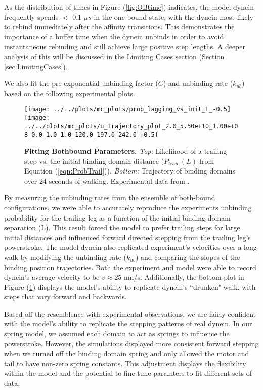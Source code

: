 As the distribution of times in Figure (\ref{fig:OBtime}) indicates, the model dynein frequently spends $<$ 0.1 $\mu s$ in the one-bound state, with the dynein most likely to rebind immediately after the affinity transitions. This demonstrates the importance of a buffer time when the dynein unbinds in order to avoid instantaneous rebinding and still achieve large positive step lengths. A deeper analysis of this will be discussed in the Limiting Cases section (Section \ref{sec:LimitingCases}).

We also fit the pre-exponential unbinding factor ($C$) and unbinding rate ($k_{ub}$) based on the following experimental plots.

\begin{figure}[H]
	\centering
	\texttt{[image: ../../plots/mc\_plots/prob\_lagging\_vs\_init\_L\_-0.5]}
	\texttt{[image: ../../plots/mc\_plots/u\_trajectory\_plot\_2.0\_5.50e+10\_1.00e+08\_0.0\_1.0\_1.0\_120.0\_197.0\_242.0\_-0.5]}
	\caption[Fitting Bothbound Parameters]{\textbf{Fitting Bothbound Parameters.} \textit{Top: }Likelihood of a trailing step vs. the initial binding domain distance ($P_{trail.}(L)$ from Equation (\ref{eqn:ProbTrail})). \textit{Bottom: }Trajectory of binding domains over 24 seconds of walking. Experimental data from \cite{Dewitt2012}.}
	\label{fig:BBPlots}
\end{figure}

By measuring the unbinding rates from the ensemble of both-bound configurations, we were able to accurately reproduce the experiments unbinding probability for the trailing leg as a function of the initial binding domain separation (L). This result forced the model to prefer trailing steps for large initial distances and influenced forward directed stepping from the trailing leg's powerstroke. The model dynein also replicated experiment's velocities over a long walk by modifying the unbinding rate ($k_{ub}$) and comparing the slopes of the binding position trajectories. Both the experiment and model were able to record dynein's average velocity to be $v\approx25$ nm/s. Additionally, the bottom plot in Figure (\ref{fig:BBPlots}) displays the model's ability to replicate dynein's ``drunken" walk, with steps that vary forward and backwards. 

Based off the resemblence with experimental observations, we are fairly confident with the model's ability to replicate the stepping patterns of real dynein. In our spring model, we assumed each domain to act as springs to influence the powerstroke. However, the simulations displayed more consistent forward stepping when we turned off the binding domain spring and only allowed the motor and tail to have non-zero spring constants. This adjustment displays the flexibility within the model and the potential to fine-tune paramters to fit different sets of data. 

